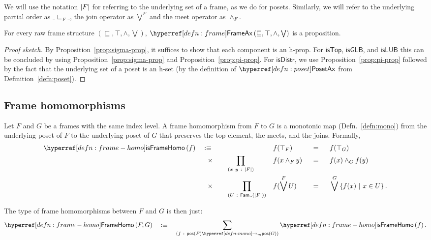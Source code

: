 We will use the notation $\left| F \right|$ for referring to the underlying set of a frame, as we
do for posets. Similarly, we will refer to the underlying partial order as $\_\sqsubseteq_F\_$, the
join operator as $\bigvee^F$ and the meet operator as $\wedge_F$.

\begin{prop}
  For every raw frame structure $(\sqsubseteq, \top, \wedge, \bigvee)$, $\frameax{\sqsubseteq, \top, \wedge, \bigvee}$ is a proposition.
\end{prop}
\begin{proof}[Proof sketch]
  By Proposition~\ref{prop:sigma-prop}, it suffices to show that each component is an
  h-prop. For $\mathsf{isTop}$, $\mathsf{isGLB}$, and $\mathsf{isLUB}$ this can be
  concluded by using Proposition~\ref{prop:sigma-prop} and Proposition~\ref{prop:pi-prop}.
  For $\mathsf{isDistr}$, we use Proposition~\ref{prop:pi-prop} followed by the fact that
  the underlying set of a poset is an h-set (by the definition of $\posetaxnm{}$ from
  Definition~\ref{defn:poset}).
\end{proof}

\subsection{Frame homomorphisms}

\begin{defn}\label{defn:frame-homo}
  Let $F$ and $G$ be a frames with the same index level. A frame homomorphism from $F$ to
  $G$ is a monotonic map (Defn.~\ref{defn:mono}) from the underlying poset of $F$ to the
  underlying poset of $G$ that preserves the top element, the meets, and the joins.
  Formally,
  \begin{alignat*}{5}
    \isframehomo{f} \quad&\is\quad &&  &&f(\top_F) &&\idnm{} &&f(\top_G) \\
                     &\hspace{0.75em}\times\quad &&\pity{x~y}{\abs{F}}{&&f(x \wedge_F y) &&\idnm{} &&f(x) \wedge_G f(y)} \\
                     &\hspace{0.75em}\times\quad &&\pity{U}{\sub{o}{\abs{F}}}{&&f(\bigvee^F U) &&\idnm{} &&\bigvee^G \setof{ f(x) ~|~ x \in U }}.
  \end{alignat*}

  The type of frame homomorphisms between $F$ and $G$ is then just:
  \begin{equation*}
    \framehomo{F}{G} \quad\is\quad \sigmaty{f}{\mono{\posof{F}}{\posof{G}}}{\isframehomo{f}}.
  \end{equation*}
\end{defn}


